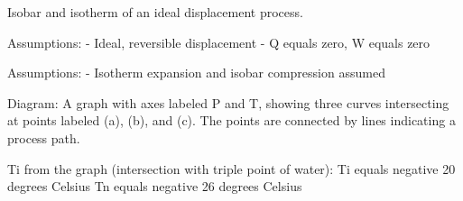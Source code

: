 Isobar and isotherm of an ideal displacement process.

Assumptions:
- Ideal, reversible displacement
- Q equals zero, W equals zero

Assumptions:
- Isotherm expansion and isobar compression assumed

Diagram:
A graph with axes labeled P and T, showing three curves intersecting at points labeled (a), (b), and (c). The points are connected by lines indicating a process path.

Ti from the graph (intersection with triple point of water):
Ti equals negative 20 degrees Celsius
Tn equals negative 26 degrees Celsius
